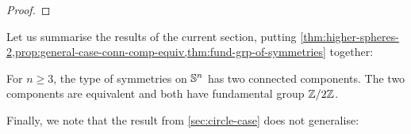 \documentclass[english,a4paper]{lmcs}
\begin{document}
\begin{proof}
\end{proof}


Let us summarise the results of the current section, putting \cref{thm:higher-spheres-2,prop:general-case-conn-comp-equiv,thm:fund-grp-of-symmetries} together:

\begin{thm}
    For $n \geq 3$, the type of symmetries on ${\mathbb S^{n}}$ has two connected components. The two components are equivalent and both have fundamental group $\mathbb{Z} \slash 2\mathbb{Z}$.
\end{thm}


Finally, we note that the result from \cref{sec:circle-case} does not generalise:
\end{document}
